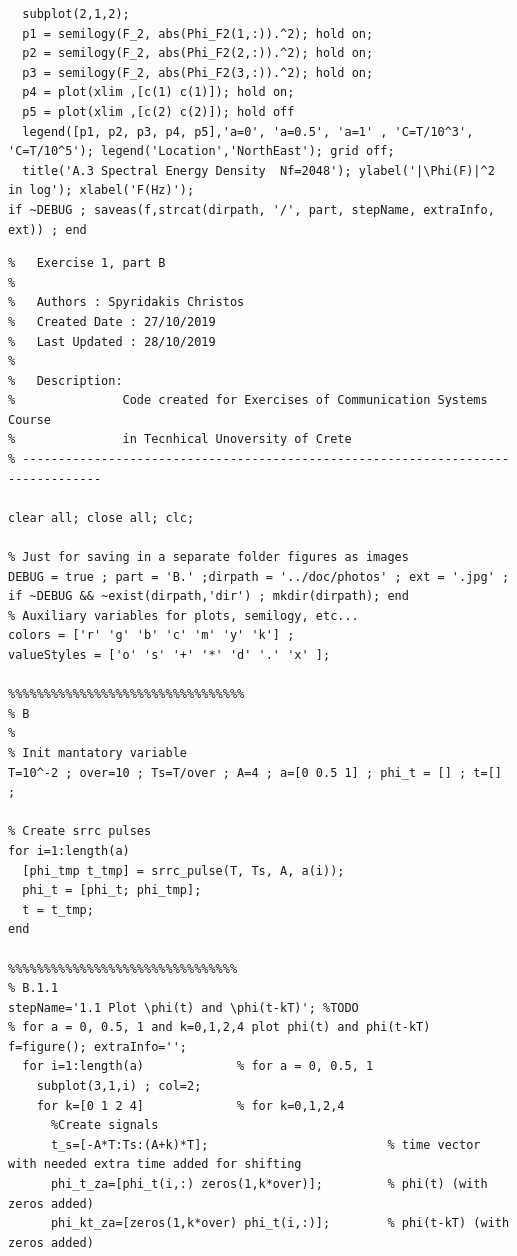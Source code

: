 \documentclass[11pt]{article}
\begin{document}
\begin{lstlisting}[caption = {\texttt{part\_a.m}}]
  % Nf = 2048
  subplot(2,1,2); 
  p1 = semilogy(F_2, abs(Phi_F2(1,:)).^2); hold on;
  p2 = semilogy(F_2, abs(Phi_F2(2,:)).^2); hold on;
  p3 = semilogy(F_2, abs(Phi_F2(3,:)).^2); hold on;
  p4 = plot(xlim ,[c(1) c(1)]); hold on;
  p5 = plot(xlim ,[c(2) c(2)]); hold off
  legend([p1, p2, p3, p4, p5],'a=0', 'a=0.5', 'a=1' , 'C=T/10^3', 'C=T/10^5'); legend('Location','NorthEast'); grid off;
  title('A.3 Spectral Energy Density  Nf=2048'); ylabel('|\Phi(F)|^2 in log'); xlabel('F(Hz)');
if ~DEBUG ; saveas(f,strcat(dirpath, '/', part, stepName, extraInfo, ext)) ; end
\end{lstlisting}
   
   
   
%
%
%
\begin{lstlisting}[caption = {\texttt{part\_b.m}}]
% ---------------------------------------------------------------------------------
%   Exercise 1, part B
%
%   Authors : Spyridakis Christos
%   Created Date : 27/10/2019
%   Last Updated : 28/10/2019
%
%   Description: 
%               Code created for Exercises of Communication Systems Course
%               in Tecnhical Unoversity of Crete
% ---------------------------------------------------------------------------------

clear all; close all; clc;

% Just for saving in a separate folder figures as images
DEBUG = true ; part = 'B.' ;dirpath = '../doc/photos' ; ext = '.jpg' ; if ~DEBUG && ~exist(dirpath,'dir') ; mkdir(dirpath); end
% Auxiliary variables for plots, semilogy, etc...
colors = ['r' 'g' 'b' 'c' 'm' 'y' 'k'] ;
valueStyles = ['o' 's' '+' '*' 'd' '.' 'x' ];

%%%%%%%%%%%%%%%%%%%%%%%%%%%%%%%%%
% B
%
% Init mantatory variable 
T=10^-2 ; over=10 ; Ts=T/over ; A=4 ; a=[0 0.5 1] ; phi_t = [] ; t=[] ; 

% Create srrc pulses 
for i=1:length(a)
  [phi_tmp t_tmp] = srrc_pulse(T, Ts, A, a(i));
  phi_t = [phi_t; phi_tmp];
  t = t_tmp;
end

%%%%%%%%%%%%%%%%%%%%%%%%%%%%%%%%
% B.1.1
stepName='1.1 Plot \phi(t) and \phi(t-kT)'; %TODO
% for a = 0, 0.5, 1 and k=0,1,2,4 plot phi(t) and phi(t-kT)
f=figure(); extraInfo='';
  for i=1:length(a)             % for a = 0, 0.5, 1
    subplot(3,1,i) ; col=2;
    for k=[0 1 2 4]             % for k=0,1,2,4
      %Create signals
      t_s=[-A*T:Ts:(A+k)*T];                         % time vector with needed extra time added for shifting
      phi_t_za=[phi_t(i,:) zeros(1,k*over)];         % phi(t) (with zeros added)
      phi_kt_za=[zeros(1,k*over) phi_t(i,:)];        % phi(t-kT) (with zeros added)
      

\end{lstlisting}
\end{document}
